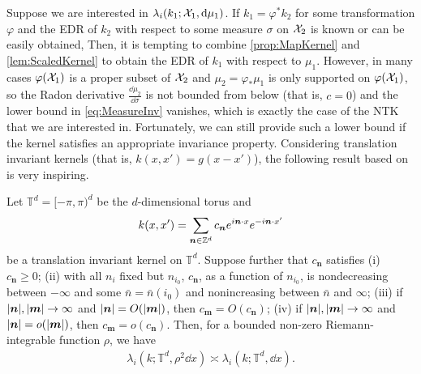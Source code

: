 Suppose we are interested in $\lambda_i(k_1;\mathcal{X}_1,\dd \mu_1)$.
If $k_1 = \varphi^* k_2$ for some transformation $\varphi$ and the EDR of $k_2$ with respect to some measure $\sigma$ on $\mathcal{X}_2$
is known or can be easily obtained,
Then, it is tempting to combine \cref{prop:MapKernel} and \cref{lem:ScaledKernel} to obtain the EDR of $k_1$ with respect to $\mu_1$.
However, in many cases $\varphi(\mathcal{X}_1)$ is a proper subset of $\mathcal{X}_2$ and $\mu_2 = \varphi_* \mu_1$ is only supported on $\varphi(\mathcal{X}_1)$,
so the Radon derivative $\frac{\dd \mu_2}{\dd \sigma}$ is not bounded from below (that is, $c=0$) and the lower bound in \cref{eq:MeasureInv} vanishes,
which is exactly the case of the NTK that we are interested in.
Fortunately, we can still provide such a lower bound if the kernel satisfies an appropriate invariance property.
Considering translation invariant kernels (that is, $k(x,x') = g(x-x')$), the following result based on \citet{widom1963_AsymptoticBehavior} is very inspiring.

\begin{proposition}
  \label{prop:WidomResult}
  Let $\mathbb{T}^d = [-\pi,\pi)^d$ be the $d$-dimensional torus and
  \begin{align*}
    k(x,x') = \sum_{\bm{n} \in \mathbb{Z}^d} c_{\bm{n}} e^{i \bm{n} \cdot x} e^{-i \bm{n} \cdot x'}
  \end{align*}
  be a translation invariant kernel on $\mathbb{T}^d$.
  Suppose further that $c_{\bm{n}}$ satisfies (i) $c_{\bm{n}} \geq 0$;
  (ii) with all $n_i$ fixed but $n_{i_0}$, $c_{\bm{n}}$, as a function of $n_{i_0}$, is nondecreasing between $-\infty$
  and some $\bar{n} = \bar{n}(i_0)$ and nonincreasing between $\bar{n}$ and $\infty$;
  (iii) if $\abs{\bm{n}}, \abs{\bm{m}} \to \infty$ and $\abs{\bm{n}} = O(\abs{\bm{m}})$, then $c_{\bm{m}} = O(c_{\bm{n}})$;
  (iv) if $\abs{\bm{n}}, \abs{\bm{m}} \to \infty$ and $\abs{\bm{n}} = o(\abs{\bm{m}})$, then $c_{\bm{m}} = o(c_{\bm{n}})$.
  Then, for a bounded non-zero Riemann-integrable function $\rho$,
  we have
  \begin{align*}
    \lambda_i(k;\mathbb{T}^d, \rho^2 \dd x) \asymp \lambda_i(k;\mathbb{T}^d,\dd x).
  \end{align*}
\end{proposition}

